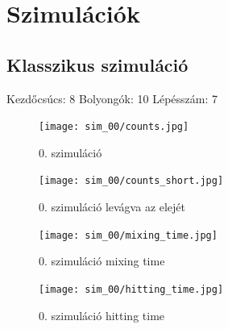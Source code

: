 \documentclass[14pt,a4paper]{article}
\begin{document}
\section{Szimulációk}
\subsection{Klasszikus szimuláció}
Kezdőcsúcs: 8
Bolyongók: 10
Lépésszám: 7
\begin{figure}[H]
\centering
\texttt{[image: sim\_00/counts.jpg]}
\caption{0. szimuláció}
\end{figure}
\begin{figure}[H]
\centering
\texttt{[image: sim\_00/counts\_short.jpg]}
\caption{0. szimuláció levágva az elejét}
\end{figure}
\begin{figure}[H]
\centering
\texttt{[image: sim\_00/mixing\_time.jpg]}
\caption{0. szimuláció mixing time}
\end{figure}
\begin{figure}[H]
\centering
\texttt{[image: sim\_00/hitting\_time.jpg]}
\caption{0. szimuláció hitting time}
\end{figure}
\end{document}
